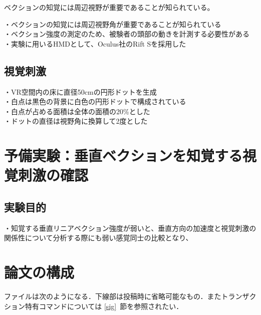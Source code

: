 \documentclass[submit,techrep]{ipsj}
\begin{document}
ベクションの知覚には周辺視野が重要であることが知られている。

・ベクションの知覚には周辺視野角が重要であることが知られている\\
・ベクション強度の測定のため、被験者の頭部の動きを計測する必要性がある\\
・実験に用いるHMDとして、Oculus社のRift Sを採用した\\

\subsection{視覚刺激}

・VR空間内の床に直径50cmの円形ドットを生成\\
・白点は黒色の背景に白色の円形ドットで構成されている\\
・白点が占める面積は全体の面積の20\%とした\\
・ドットの直径は視野角に換算して2度とした\\


\section{予備実験：垂直ベクションを知覚する視覚刺激の確認}
\label{sec:format}

\subsection{実験目的}
・知覚する垂直リニアベクション強度が弱いと、垂直方向の加速度と視覚刺激の関係性について分析する際にも弱い感覚同士の比較となり、


\section{論文の構成}
\label{config}

ファイルは次のようになる．下線部は投稿時に省略可能なもの．またトランザク
ション特有コマンドについては \ref{sig}~節を参照されたい．
\end{document}
